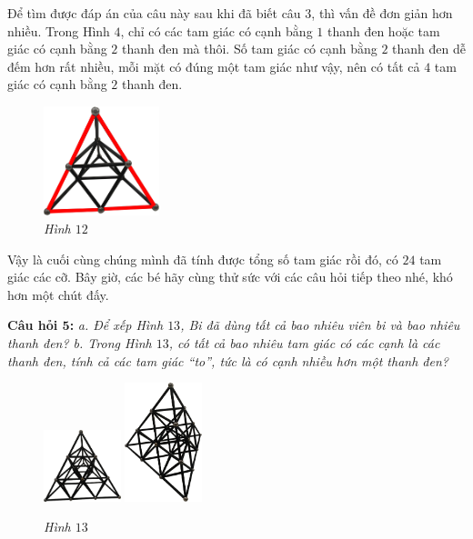	\vspace*{-5pt}
	\begin{multicols}{2}
		Để tìm được đáp án của câu này sau khi đã biết câu $3$, thì vấn đề đơn giản hơn nhiều. Trong Hình $4$, chỉ có các tam giác có cạnh bằng $1$  thanh đen hoặc tam giác có cạnh bằng $2$ thanh đen mà thôi. Số tam giác có cạnh bằng $2$ thanh đen dễ đếm hơn rất nhiều, mỗi mặt có đúng một tam giác như vậy, nên có tất cả $4$ tam giác có cạnh bằng $2$ thanh đen.
		\begin{figure}[H]
			\centering
			\vspace*{-5pt}
			\captionsetup{labelformat= empty, justification=centering} \includegraphics[width=0.3\textwidth]{12}
			\caption{\small\textit{Hình $12$}}
			\vspace*{-5pt}
		\end{figure}
	\end{multicols}
	Vậy là cuối cùng chúng mình đã tính được tổng số tam giác rồi đó, có $24$ tam giác các cỡ.
	\vskip 0.1cm
	Bây giờ, các bé hãy cùng thử sức với các câu hỏi tiếp theo nhé, khó hơn một chút đấy.
	\begin{multicols}{2}
	\textbf{Câu hỏi $\pmb{5}$:} \textit{a. Để xếp Hình $13$, Bi đã dùng tất cả bao nhiêu viên bi và bao nhiêu thanh đen? 
	\vskip 0.1cm
	b. Trong Hình $13$, có tất cả bao nhiêu tam giác có các cạnh là các thanh đen, tính cả các tam giác “to”, tức là có cạnh nhiều hơn một thanh đen?}
	\begin{figure}[H]
		\centering
		\vspace*{5pt}
		\captionsetup{labelformat= empty, justification=centering} \includegraphics[width=0.2\textwidth]{13}
		\quad
		\includegraphics[width=0.2\textwidth]{13a}
		\caption{\small\textit{Hình $13$}}
		\vspace*{-5pt}
	\end{figure}
	\end{multicols}







